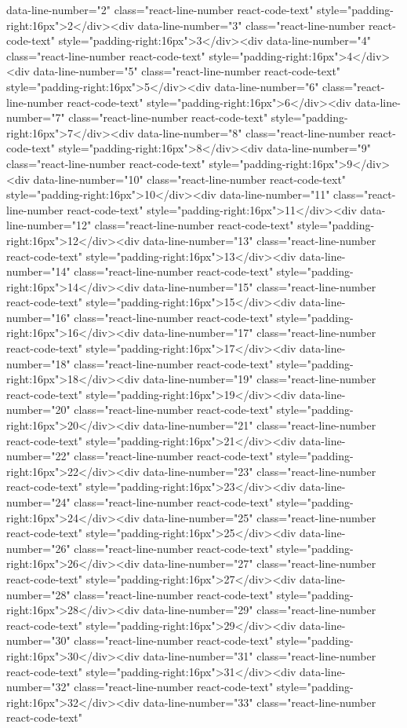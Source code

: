 {{{{{{{{{{{{{{{{{{{{{{{{{{{{{data-line-number="2" class="react-line-number react-code-text" style="padding-right:16px">2</div><div data-line-number="3" class="react-line-number react-code-text" style="padding-right:16px">3</div><div data-line-number="4" class="react-line-number react-code-text" style="padding-right:16px">4</div><div data-line-number="5" class="react-line-number react-code-text" style="padding-right:16px">5</div><div data-line-number="6" class="react-line-number react-code-text" style="padding-right:16px">6</div><div data-line-number="7" class="react-line-number react-code-text" style="padding-right:16px">7</div><div data-line-number="8" class="react-line-number react-code-text" style="padding-right:16px">8</div><div data-line-number="9" class="react-line-number react-code-text" style="padding-right:16px">9</div><div data-line-number="10" class="react-line-number react-code-text" style="padding-right:16px">10</div><div data-line-number="11" class="react-line-number react-code-text" style="padding-right:16px">11</div><div data-line-number="12" class="react-line-number react-code-text" style="padding-right:16px">12</div><div data-line-number="13" class="react-line-number react-code-text" style="padding-right:16px">13</div><div data-line-number="14" class="react-line-number react-code-text" style="padding-right:16px">14</div><div data-line-number="15" class="react-line-number react-code-text" style="padding-right:16px">15</div><div data-line-number="16" class="react-line-number react-code-text" style="padding-right:16px">16</div><div data-line-number="17" class="react-line-number react-code-text" style="padding-right:16px">17</div><div data-line-number="18" class="react-line-number react-code-text" style="padding-right:16px">18</div><div data-line-number="19" class="react-line-number react-code-text" style="padding-right:16px">19</div><div data-line-number="20" class="react-line-number react-code-text" style="padding-right:16px">20</div><div data-line-number="21" class="react-line-number react-code-text" style="padding-right:16px">21</div><div data-line-number="22" class="react-line-number react-code-text" style="padding-right:16px">22</div><div data-line-number="23" class="react-line-number react-code-text" style="padding-right:16px">23</div><div data-line-number="24" class="react-line-number react-code-text" style="padding-right:16px">24</div><div data-line-number="25" class="react-line-number react-code-text" style="padding-right:16px">25</div><div data-line-number="26" class="react-line-number react-code-text" style="padding-right:16px">26</div><div data-line-number="27" class="react-line-number react-code-text" style="padding-right:16px">27</div><div data-line-number="28" class="react-line-number react-code-text" style="padding-right:16px">28</div><div data-line-number="29" class="react-line-number react-code-text" style="padding-right:16px">29</div><div data-line-number="30" class="react-line-number react-code-text" style="padding-right:16px">30</div><div data-line-number="31" class="react-line-number react-code-text" style="padding-right:16px">31</div><div data-line-number="32" class="react-line-number react-code-text" style="padding-right:16px">32</div><div data-line-number="33" class="react-line-number react-code-text" }}}}}}}}}}}}}}}}}}}}}}}}}}}}}
